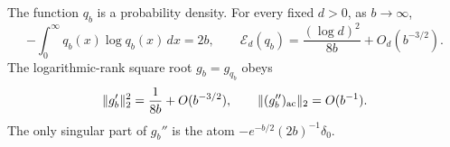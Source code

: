 \begin{proposition}\label{prop:CL-sharp-law}
The function $q_b$ is a probability density.  For every fixed $d>0$,
as $b\to\infty$,
\begin{equation}\label{eq:CL-law-rigorous}
 -\int_0^\infty q_b(x)\log q_b(x)\,dx=2b,
 \qquad
 \mathcal E_d(q_b)=\frac{(\log d)^2}{8b}
                   +O_d(b^{-3/2}).
\end{equation}
The logarithmic-rank square root $g_b=g_{q_b}$ obeys
\begin{equation}\label{eq:CL-derivative-bounds}
 \lVert g_b'\rVert_2^2=\frac1{8b}+O(b^{-3/2}),
 \qquad
 \lVert (g_b'')_{\rm ac}\rVert_2=O(b^{-1}).
\end{equation}
The only singular part of $g_b''$ is the atom
$-e^{-b/2}(2b)^{-1}\delta_0$.
\end{proposition}


